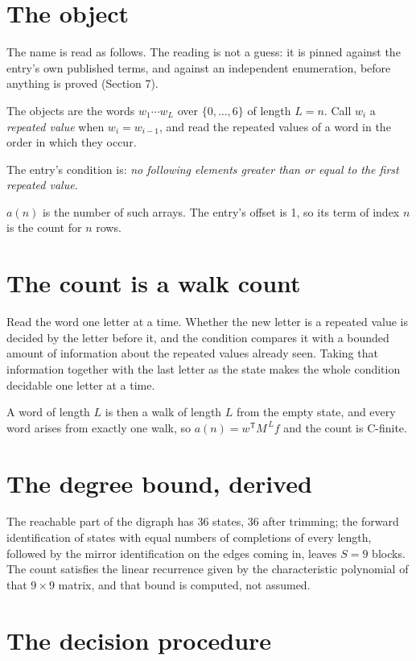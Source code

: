 \documentclass[11pt]{article}
\theoremstyle{definition}
\begin{document}
\section{The object}

The name is read as follows. The reading is not a guess: it is pinned against the entry's own published terms, and against an independent enumeration, before anything is proved (Section 7).

The objects are the words $w_1\cdots w_L$ over $\{0,\dots,6\}$ of length $L = n$. Call $w_i$ a {\itshape repeated value} when $w_i = w_{i-1}$, and read the repeated values of a word in the order in which they occur.

The entry's condition is: {\itshape no following elements greater than or equal to the first repeated value}.

$a(n)$ is the number of such arrays. The entry's offset is 1, so its term of index $n$ is the count for $n$ rows.

\section{The count is a walk count}

Read the word one letter at a time. Whether the new letter is a repeated value is decided by the letter before it, and the condition compares it with a bounded amount of information about the repeated values already seen. Taking that information together with the last letter as the state makes the whole condition decidable one letter at a time.

A word of length $L$ is then a walk of length $L$ from the empty state, and every word arises from exactly one walk, so $a(n) = w^{\mathsf T}M^{\,L}f$ and the count is C-finite.

\section{The degree bound, derived}

The reachable part of the digraph has $36$ states, $36$ after trimming; the forward identification of states with equal numbers of completions of every length, followed by the mirror identification on the edges coming in, leaves $S = 9$ blocks. The count satisfies the linear recurrence given by the characteristic polynomial of that $9\times9$ matrix, and that bound is computed, not assumed.

\section{The decision procedure}
\end{document}
